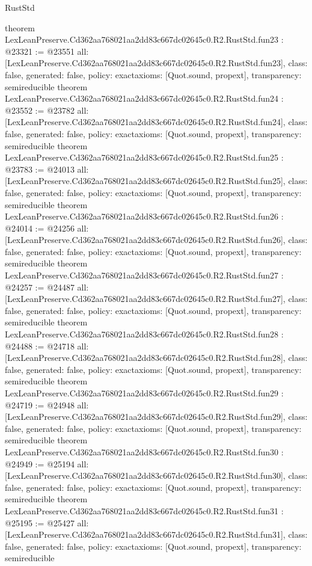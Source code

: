\begin{lexlean}{RustStd}
\begin{coremodule}
{}
theorem LexLeanPreserve.Cd362aa768021aa2dd83c667dc02645c0.R2.RustStd.fun23 : @23321 := @23551 {
  all: [LexLeanPreserve.Cd362aa768021aa2dd83c667dc02645c0.R2.RustStd.fun23],
  class: false,
  generated: false,
  policy: exact{axioms: [Quot.sound, propext]},
  transparency: semireducible
}
theorem LexLeanPreserve.Cd362aa768021aa2dd83c667dc02645c0.R2.RustStd.fun24 : @23552 := @23782 {
  all: [LexLeanPreserve.Cd362aa768021aa2dd83c667dc02645c0.R2.RustStd.fun24],
  class: false,
  generated: false,
  policy: exact{axioms: [Quot.sound, propext]},
  transparency: semireducible
}
theorem LexLeanPreserve.Cd362aa768021aa2dd83c667dc02645c0.R2.RustStd.fun25 : @23783 := @24013 {
  all: [LexLeanPreserve.Cd362aa768021aa2dd83c667dc02645c0.R2.RustStd.fun25],
  class: false,
  generated: false,
  policy: exact{axioms: [Quot.sound, propext]},
  transparency: semireducible
}
theorem LexLeanPreserve.Cd362aa768021aa2dd83c667dc02645c0.R2.RustStd.fun26 : @24014 := @24256 {
  all: [LexLeanPreserve.Cd362aa768021aa2dd83c667dc02645c0.R2.RustStd.fun26],
  class: false,
  generated: false,
  policy: exact{axioms: [Quot.sound, propext]},
  transparency: semireducible
}
theorem LexLeanPreserve.Cd362aa768021aa2dd83c667dc02645c0.R2.RustStd.fun27 : @24257 := @24487 {
  all: [LexLeanPreserve.Cd362aa768021aa2dd83c667dc02645c0.R2.RustStd.fun27],
  class: false,
  generated: false,
  policy: exact{axioms: [Quot.sound, propext]},
  transparency: semireducible
}
theorem LexLeanPreserve.Cd362aa768021aa2dd83c667dc02645c0.R2.RustStd.fun28 : @24488 := @24718 {
  all: [LexLeanPreserve.Cd362aa768021aa2dd83c667dc02645c0.R2.RustStd.fun28],
  class: false,
  generated: false,
  policy: exact{axioms: [Quot.sound, propext]},
  transparency: semireducible
}
theorem LexLeanPreserve.Cd362aa768021aa2dd83c667dc02645c0.R2.RustStd.fun29 : @24719 := @24948 {
  all: [LexLeanPreserve.Cd362aa768021aa2dd83c667dc02645c0.R2.RustStd.fun29],
  class: false,
  generated: false,
  policy: exact{axioms: [Quot.sound, propext]},
  transparency: semireducible
}
theorem LexLeanPreserve.Cd362aa768021aa2dd83c667dc02645c0.R2.RustStd.fun30 : @24949 := @25194 {
  all: [LexLeanPreserve.Cd362aa768021aa2dd83c667dc02645c0.R2.RustStd.fun30],
  class: false,
  generated: false,
  policy: exact{axioms: [Quot.sound, propext]},
  transparency: semireducible
}
theorem LexLeanPreserve.Cd362aa768021aa2dd83c667dc02645c0.R2.RustStd.fun31 : @25195 := @25427 {
  all: [LexLeanPreserve.Cd362aa768021aa2dd83c667dc02645c0.R2.RustStd.fun31],
  class: false,
  generated: false,
  policy: exact{axioms: [Quot.sound, propext]},
  transparency: semireducible
}
\end{coremodule}
\end{lexlean}
